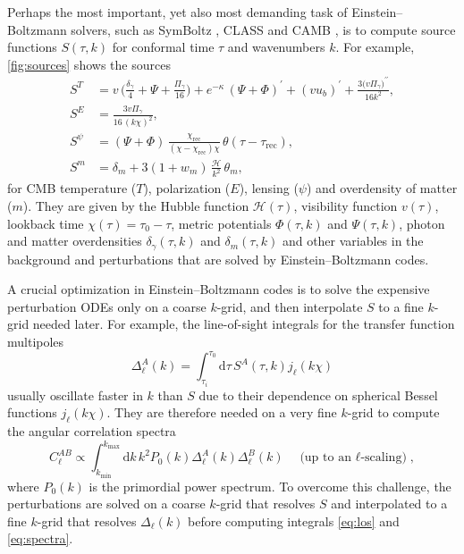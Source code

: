 \documentclass{aa}
\newcommand\taurec{\tau_\text{rec}}
\newcommand\kmin{{k_\text{min}}}
\newcommand\kmax{{k_\text{max}}}
\newcommand\EB{Einstein–Boltzmann}
\newcommand\scrH{\mathscr{H}}
\newcommand\diff[1]{\mathrm{d}{#1}}
\begin{document}
Perhaps the most important, yet also most demanding task of \EB{} solvers, such as SymBoltz \citep{sletmoenSymBoltzjlSymbolicnumericApproximationfree2026a}, CLASS \citep{blasCosmicLinearAnisotropy2011b} and CAMB \citep{lewisEfficientComputationCMB2000b}, is to compute source functions $S(\tau, k)$ for conformal time $\tau$ and wavenumbers $k$.
For example, \cref{fig:sources} shows the sources
\begin{subequations}
	\begin{align}
		S^T    & = v \, \Bigg(\frac{\delta_\gamma}{4} + \Psi + \frac{\Pi_\gamma}{16}\Bigg) + e^{-\kappa} \, (\Psi + \Phi)^\prime + (v u_b)^\prime + \frac{3\big(v \Pi_\gamma\big)^{\prime\prime}}{16 k^2}, \\
		S^E    & = \frac{3 v \Pi_\gamma}{16 \, (k \chi)^2}, \\
		S^\psi & = (\Psi+\Phi) \, \frac{\chi_\text{rec}}{(\chi-\chi_\text{rec}) \chi} \, \theta(\tau - \taurec), \\
		S^m    & = \delta_m + 3 (1+w_m) \, \frac{\scrH}{k^2} \, \theta_m ,
	\end{align}
	\label{eq:sources}%
\end{subequations}
for CMB temperature ($T$), polarization ($E$), lensing ($\psi$) and overdensity of matter ($m$).
They are given by the Hubble function $\scrH(\tau)$, visibility function $v(\tau)$, lookback time $\chi(\tau) = \tau_0 - \tau$, metric potentials $\Phi(\tau, k)$ and $\Psi(\tau, k)$, photon and matter overdensities $\delta_\gamma(\tau, k)$ and $\delta_m(\tau, k)$ and other variables in the background and perturbations that are solved by \EB{} codes.

A crucial optimization in \EB{} codes is to solve the expensive perturbation ODEs only on a coarse $k$-grid, and then interpolate $S$ to a fine $k$-grid needed later.
For example, the line-of-sight integrals for the transfer function multipoles
\begin{equation}
    \Delta^A_\ell(k) = \int_{\tau_i}^{\tau_0} \diff{\tau} \, S^A(\tau, k) j_\ell(k \chi)
    \label{eq:los}
\end{equation}
usually oscillate faster in $k$ than $S$ due to their dependence on spherical Bessel functions $j_\ell(k\chi)$.
They are therefore needed on a very fine $k$-grid to compute the angular correlation spectra
\begin{equation}
    C_\ell^{AB} \propto \iffalse \frac{2}{\pi} \fi \int_\kmin^\kmax \diff{k} \, k^2 P_0(k) \Delta^A_\ell(k) \Delta^B_\ell(k) \quad \text{(up to an $\ell$-scaling)},
    \label{eq:spectra}
\end{equation}
where $P_0(k)$ is the primordial power spectrum.
To overcome this challenge, the perturbations are solved on a coarse $k$-grid that resolves $S$ and interpolated to a fine $k$-grid that resolves $\Delta_\ell(k)$ before computing integrals \eqref{eq:los} and \eqref{eq:spectra}.
\end{document}
